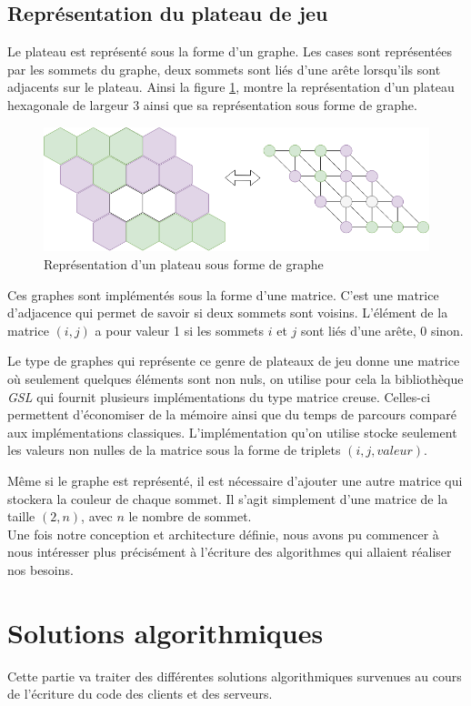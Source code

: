 \documentclass[a4paper, 12pt]{article}
\begin{document}
\subsection{Représentation du plateau de jeu}
Le plateau est représenté sous la forme d'un graphe. Les cases sont représentées par les sommets du graphe, deux sommets sont liés d'une arête lorsqu'ils sont adjacents sur le plateau. Ainsi la figure \ref{fig:graphrep}, montre la représentation d'un plateau hexagonale de largeur 3 ainsi que sa représentation sous forme de graphe.

\begin{figure}[h]
  \centering
  \includegraphics[width=.7\linewidth]{./pictures/graphrep.png}
  \caption{Représentation d'un plateau sous forme de graphe}
  \label{fig:graphrep}
\end{figure}

Ces graphes sont implémentés sous la forme d'une matrice. C'est une matrice d'adjacence qui permet de savoir si deux sommets sont voisins. L'élément de la matrice $(i,j)$ a pour valeur 1 si les sommets $i$ et $j$ sont liés d'une arête, 0 sinon.

Le type de graphes qui représente ce genre de plateaux de jeu donne une matrice où seulement quelques éléments sont non nuls, on utilise pour cela la bibliothèque \emph{GSL} qui fournit plusieurs implémentations du type matrice creuse. Celles-ci permettent d'économiser de la mémoire ainsi que du temps de parcours comparé aux implémentations classiques. L'implémentation qu'on utilise stocke seulement les valeurs non nulles de la matrice sous la forme de triplets $(i,j,valeur)$.

Même si le graphe est représenté, il est nécessaire d'ajouter une autre matrice qui stockera la couleur de chaque sommet. Il s'agit simplement d'une matrice de la taille $(2, n)$, avec $n$ le nombre de sommet.\\

Une fois notre conception et architecture définie, nous avons pu commencer à nous intéresser plus précisément à l'écriture des algorithmes qui allaient réaliser nos besoins.


\section{Solutions algorithmiques}
Cette partie va traiter des différentes solutions algorithmiques survenues au cours de l'écriture du code des clients et des serveurs.
\end{document}
